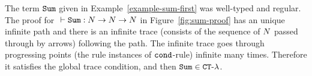 \begin{example}\label{example-sum}
The term ${\tt Sum}$ given in Example~\ref{example-sum-first} was well-typed and regular.
The proof for $\ \vdash \Sum:\N \rightarrow \N \rightarrow \N$ in Figure~\ref{fig:sum-proof} 
has an unique infinite path
and there is an infinite trace (consists of the sequence of ${N}$ passed through by arrows) 
following the path. 
The infinite trace goes through progressing points (the rule instances of ${\tt cond}$-rule)
infinite many times. Therefore it satisfies the global trace condition, and then ${\tt Sum} \in { {\tt CT}\mbox{-}\lambda}$. 


\end{example}

